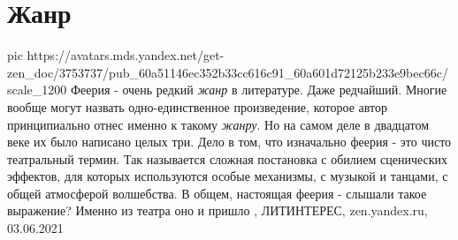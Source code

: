  
 
 
 
 
\chapter{Жанр}
\label{sec:slova.zhanr}

\ifcmt
  pic https://avatars.mds.yandex.net/get-zen_doc/3753737/pub_60a51146ec352b33cc616c91_60a601d72125b233e9bec66c/scale_1200
\fi
Феерия - очень редкий \emph{жанр} в литературе. Даже редчайший. Многие вообще могут
назвать одно-единственное произведение, которое автор принципиально отнес
именно к такому \emph{жанру}. Но на самом деле в двадцатом веке их было написано целых
три.  Дело в том, что изначально феерия - это чисто театральный термин. Так
называется сложная постановка с обилием сценических эффектов, для которых
используются особые механизмы, с музыкой и танцами, с общей атмосферой
волшебства. В общем, настоящая феерия - слышали такое выражение? Именно из
театра оно и пришло
, 
ЛИТИНТЕРЕС, zen.yandex.ru, 03.06.2021

